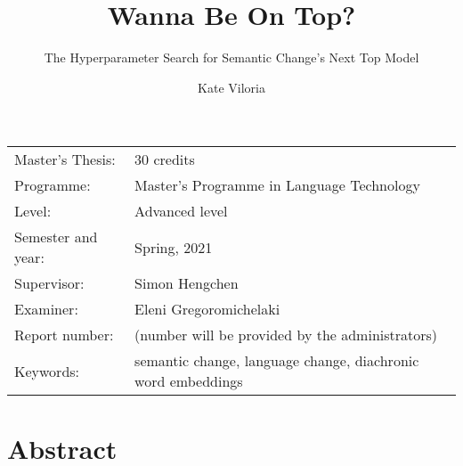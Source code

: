 \documentclass[11pt, a4paper]{article}
\title{Wanna Be On Top?}
\subtitle{The Hyperparameter Search for Semantic Change's Next Top Model}
\author{Kate Viloria}
\begin{document}
\begin{titlepage}

\maketitle

\vfill

\begingroup
\renewcommand*{\arraystretch}{1.2}
\begin{tabular}{l@{\hskip 20mm}l}
\hline
Master's Thesis: & 30 credits \\
Programme: & Master’s Programme in Language Technology\\
Level: & Advanced level \\
Semester and year: & Spring, 2021\\
Supervisor: & Simon Hengchen\\
Examiner: & Eleni Gregoromichelaki\\
Report number: & (number will be provided by the administrators) \\
Keywords: & semantic change, language change, diachronic word embeddings
\end{tabular}
\endgroup

\thispagestyle{empty}
\end{titlepage}

\newpage
\singlespacing
\section*{Abstract}
\end{document}
